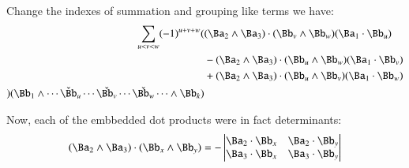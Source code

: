 Change the indexes of summation and grouping like terms we have:
\begin{align*}
\sum_{u<v<w} (-1)^{u+v+w} 
(
&(\Ba_2 \wedge \Ba_3) \cdot (\Bb_v \wedge \Bb_w) (\Ba_1 \cdot \Bb_u)  \\
&-(\Ba_2 \wedge \Ba_3) \cdot (\Bb_u \wedge \Bb_w) (\Ba_1 \cdot \Bb_v)  \\
&+(\Ba_2 \wedge \Ba_3) \cdot (\Bb_u \wedge \Bb_v) (\Ba_1 \cdot \Bb_w)  \\
) 
(\Bb_1 \wedge \cdots \check \Bb_u \cdots \check{\Bb_v} \cdots \check{\Bb_w} \cdots \wedge \Bb_k)  \\
\end{align*}

Now, each of the embbedded dot products were in fact determinants:
\[
(\Ba_2 \wedge \Ba_3) \cdot (\Bb_x \wedge \Bb_y)
=
-
\begin{vmatrix}
\Ba_2 \cdot \Bb_x & \Ba_2 \cdot \Bb_y \\
\Ba_3 \cdot \Bb_x & \Ba_3 \cdot \Bb_y \\
\end{vmatrix}
\]

